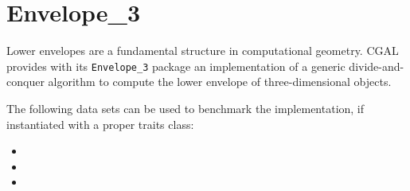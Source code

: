 \section{Envelope\_3\label{bi_sec:Envelope3}}

Lower envelopes are a fundamental structure in computational geometry.
CGAL provides with its {\tt Envelope\_3} package an implementation
of a generic divide-and-conquer algorithm to compute the lower envelope
of three-dimensional objects. 

The following data sets can be used to benchmark the
implementation, if instantiated with a proper traits class:

\begin{itemize}
\item {}
\item {}
\item {}
\end{itemize}

